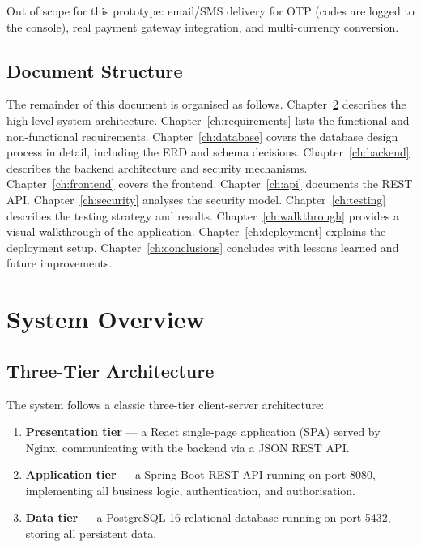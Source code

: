 \documentclass[12pt,a4paper]{report}
\begin{document}
Out of scope for this prototype: email/SMS delivery for OTP (codes are logged to the
console), real payment gateway integration, and multi-currency conversion.

\section{Document Structure}

The remainder of this document is organised as follows. Chapter~\ref{ch:overview}
describes the high-level system architecture. Chapter~\ref{ch:requirements} lists the
functional and non-functional requirements. Chapter~\ref{ch:database} covers the
database design process in detail, including the ERD and schema decisions.
Chapter~\ref{ch:backend} describes the backend architecture and security mechanisms.
Chapter~\ref{ch:frontend} covers the frontend. Chapter~\ref{ch:api} documents the
REST API. Chapter~\ref{ch:security} analyses the security model.
Chapter~\ref{ch:testing} describes the testing strategy and results.
Chapter~\ref{ch:walkthrough} provides a visual walkthrough of the application.
Chapter~\ref{ch:deployment} explains the deployment setup. Chapter~\ref{ch:conclusions}
concludes with lessons learned and future improvements.

\chapter{System Overview}
\label{ch:overview}

\section{Three-Tier Architecture}

The system follows a classic three-tier client-server architecture:

\begin{enumerate}
  \item \textbf{Presentation tier} — a React single-page application (SPA) served by
        Nginx, communicating with the backend via a JSON REST API.
  \item \textbf{Application tier} — a Spring Boot REST API running on port 8080,
        implementing all business logic, authentication, and authorisation.
  \item \textbf{Data tier} — a PostgreSQL 16 relational database running on port 5432,
        storing all persistent data.
\end{enumerate}
\end{document}
